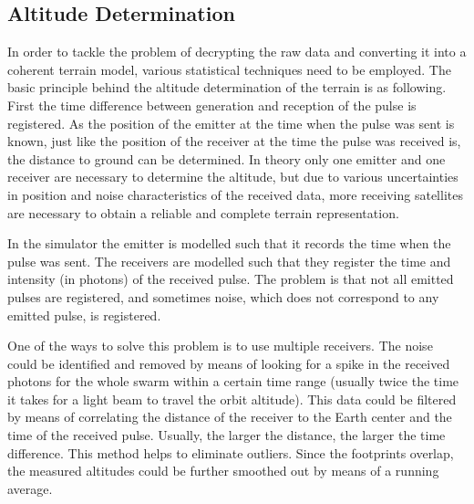 \subsection{Altitude Determination}
\label{altDet}
In order to tackle the problem of decrypting the raw data and converting it into a coherent terrain model, various statistical techniques need to be employed. The basic principle behind the altitude determination of the terrain is as following. First the time difference between generation and reception of the pulse is registered. As the position of the emitter at the time when the pulse was sent is known, just like the position of the receiver at the time the pulse was received is, the distance to ground can be determined. In theory only one emitter and one receiver are necessary to determine the altitude, but due to various uncertainties in position and noise characteristics of the received data, more receiving satellites are necessary to obtain a reliable and complete terrain representation. 

In the simulator the emitter is modelled such that it records the time when the pulse was sent. The receivers are modelled such that they register the time and intensity (in photons) of the received pulse. The problem is that not all emitted pulses are registered, and sometimes noise, which does not correspond to any emitted pulse, is registered.

One of the ways to solve this problem is to use multiple receivers. The noise could be identified and removed by means of looking for a spike in the received photons for the whole swarm within a certain time range (usually twice the time it takes for a light beam to travel the orbit altitude). This data could be filtered by means of correlating the distance of the receiver to the Earth center and the time of the received pulse. Usually, the larger the distance, the larger the time difference. This method helps to eliminate outliers.
Since the footprints overlap, the measured altitudes could be further smoothed out by means of a running average. 
